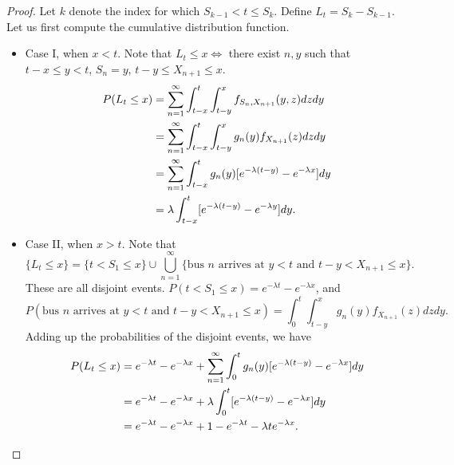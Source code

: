 \documentclass[15pt,a4paper]{book}
\theoremstyle{definition}
\begin{document}
\begin{proof}
    Let $k$ denote the index for which $S_{k-1} < t \leq S_{k}$. Define $L_{t} = S_{k} - S_{k-1}$. Let us first compute the cumulative distribution function.
    \begin{itemize}
        \item Case I, when $x < t$. Note that $L_{t} \leq x \iff$ there exist $n,y$ such that $t-x \leq y < t$, $S_{n} = y$, $t-y \leq X_{n+1} \leq x$.
        \begin{align}
            P(L_{t} \leq x) &= \sum_{n=1}^{\infty} \int_{t-x}^{t} \int_{t-y}^{x} f_{S_{n},X_{n+1}}(y,z) dz dy \notag \\
            &= \sum_{n=1}^{\infty} \int_{t-x}^{t} \int_{t-y}^{x} g_{n}(y) f_{X_{n+1}}(z) dz dy \notag \\
            &= \sum_{n=1}^{\infty} \int_{t-x}^{t} g_{n}(y) [e^{-\lambda(t-y)} - e^{-\lambda x}] dy \notag \\
            &= \lambda \int_{t-x}^{t} [e^{-\lambda(t-y)}-e^{-\lambda y}] dy.
        \end{align}
        
        \item Case II, when $x > t$. Note that
        \begin{equation}
            \{L_{t} \leq x\} = \{t < S_{1} \leq x \} \cup \bigcup_{n=1}^{\infty} \{\text{bus $n$ arrives at $y < t$ and $t-y < X_{n+1}\leq x$}\}.
        \end{equation}
        These are all disjoint events. $P(t < S_{1} \leq x) = e^{-\lambda t} - e^{-\lambda x}$, and
        \begin{equation}
            P(\text{bus $n$ arrives at $y < t$ and $t-y < X_{n+1}\leq x$}) = \int_{0}^{t} \int_{t-y}^{x} g_{n}(y) f_{X_{n+1}}(z) dz dy.
        \end{equation}
        Adding up the probabilities of the disjoint events, we have
        \begin{align}
            P(L_{t} \leq x) &= e^{-\lambda t} - e^{-\lambda x} + \sum_{n=1}^{\infty} \int_{0}^{t} g_{n}(y) [e^{-\lambda(t-y)} - e^{-\lambda x}] dy \notag \\
            &= e^{-\lambda t} - e^{-\lambda x} + \lambda \int_{0}^{t} [e^{-\lambda(t-y)}-e^{-\lambda x}]dy \notag \\
            &= e^{-\lambda t} - e^{-\lambda x} + 1 - e^{-\lambda t} - \lambda t e^{-\lambda x}.
        \end{align}
    \end{itemize}
\end{proof}
\end{document}
